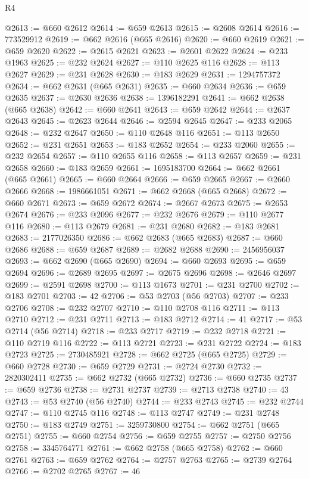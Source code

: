 \begin{lexlean}{R4}
\begin{coremodule}
@2613 := @660 @2612
@2614 := @659 @2613
@2615 := @2608 @2614
@2616 := 773529912
@2619 := @662 @2616 (@665 @2616)
@2620 := @660 @2619
@2621 := @659 @2620
@2622 := @2615 @2621
@2623 := @2601 @2622
@2624 := @233 @1963
@2625 := @232 @2624
@2627 := @110 @2625 @116
@2628 := @113 @2627
@2629 := @231 @2628
@2630 := @183 @2629
@2631 := 1294757372
@2634 := @662 @2631 (@665 @2631)
@2635 := @660 @2634
@2636 := @659 @2635
@2637 := @2630 @2636
@2638 := 1396182291
@2641 := @662 @2638 (@665 @2638)
@2642 := @660 @2641
@2643 := @659 @2642
@2644 := @2637 @2643
@2645 := @2623 @2644
@2646 := @2594 @2645
@2647 := @233 @2065
@2648 := @232 @2647
@2650 := @110 @2648 @116
@2651 := @113 @2650
@2652 := @231 @2651
@2653 := @183 @2652
@2654 := @233 @2060
@2655 := @232 @2654
@2657 := @110 @2655 @116
@2658 := @113 @2657
@2659 := @231 @2658
@2660 := @183 @2659
@2661 := 1695183700
@2664 := @662 @2661 (@665 @2661)
@2665 := @660 @2664
@2666 := @659 @2665
@2667 := @2660 @2666
@2668 := 1986661051
@2671 := @662 @2668 (@665 @2668)
@2672 := @660 @2671
@2673 := @659 @2672
@2674 := @2667 @2673
@2675 := @2653 @2674
@2676 := @233 @2096
@2677 := @232 @2676
@2679 := @110 @2677 @116
@2680 := @113 @2679
@2681 := @231 @2680
@2682 := @183 @2681
@2683 := 2177026350
@2686 := @662 @2683 (@665 @2683)
@2687 := @660 @2686
@2688 := @659 @2687
@2689 := @2682 @2688
@2690 := 2456956037
@2693 := @662 @2690 (@665 @2690)
@2694 := @660 @2693
@2695 := @659 @2694
@2696 := @2689 @2695
@2697 := @2675 @2696
@2698 := @2646 @2697
@2699 := @2591 @2698
@2700 := @113 @1673
@2701 := @231 @2700
@2702 := @183 @2701
@2703 := 42
@2706 := @53 @2703 (@56 @2703)
@2707 := @233 @2706
@2708 := @232 @2707
@2710 := @110 @2708 @116
@2711 := @113 @2710
@2712 := @231 @2711
@2713 := @183 @2712
@2714 := 41
@2717 := @53 @2714 (@56 @2714)
@2718 := @233 @2717
@2719 := @232 @2718
@2721 := @110 @2719 @116
@2722 := @113 @2721
@2723 := @231 @2722
@2724 := @183 @2723
@2725 := 2730485921
@2728 := @662 @2725 (@665 @2725)
@2729 := @660 @2728
@2730 := @659 @2729
@2731 := @2724 @2730
@2732 := 2820302411
@2735 := @662 @2732 (@665 @2732)
@2736 := @660 @2735
@2737 := @659 @2736
@2738 := @2731 @2737
@2739 := @2713 @2738
@2740 := 43
@2743 := @53 @2740 (@56 @2740)
@2744 := @233 @2743
@2745 := @232 @2744
@2747 := @110 @2745 @116
@2748 := @113 @2747
@2749 := @231 @2748
@2750 := @183 @2749
@2751 := 3259730800
@2754 := @662 @2751 (@665 @2751)
@2755 := @660 @2754
@2756 := @659 @2755
@2757 := @2750 @2756
@2758 := 3345764771
@2761 := @662 @2758 (@665 @2758)
@2762 := @660 @2761
@2763 := @659 @2762
@2764 := @2757 @2763
@2765 := @2739 @2764
@2766 := @2702 @2765
@2767 := 46

\end{coremodule}
\end{lexlean}
